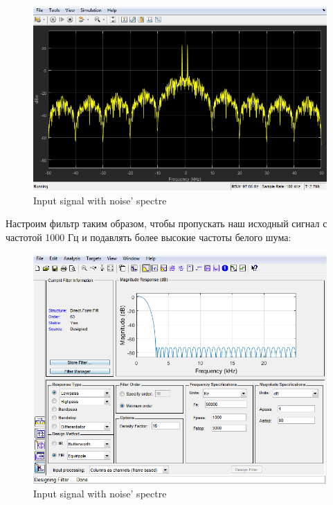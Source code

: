 \documentclass[a4paper,14pt]{extarticle}
\begin{document}
\begin{figure}[H]
    \centering
    \includegraphics{noise_sp}
	\captionsetup{justification=centering,margin=1cm}
    \caption{Input signal with noise' spectre}
    \label{fig:noise_sp}
\end{figure}
Настроим фильтр таким образом, чтобы пропускать наш исходный сигнал с частотой 1000 Гц и подавлять более высокие частоты белого шума:
\begin{figure}[H]
    \centering
    \includegraphics{filter}
	\captionsetup{justification=centering,margin=1cm}
    \caption{Input signal with noise' spectre}
    \label{fig:filter}
\end{figure}
\end{document}
